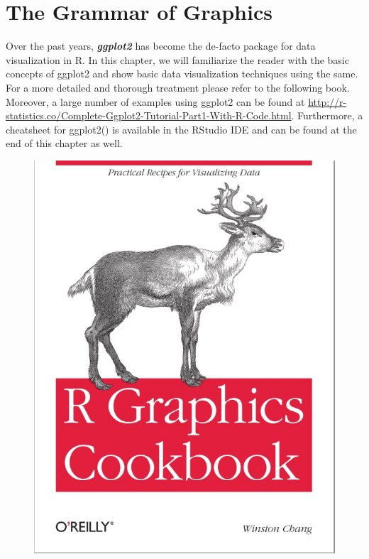 \documentclass[12pt]{book}\usepackage{knitr}
\begin{document}
\section{The Grammar of Graphics}

\begin{HIGHLIGHT}
\par{}
\end{HIGHLIGHT}

\noindent Over the past years, \textbf{\emph{ggplot2}} has become the de-facto package for data visualization in R. In this chapter, we will familiarize the reader with the basic concepts of ggplot2 and show basic data visualization techniques using the same. For a more detailed and thorough treatment please refer to the following book. Moreover, a large number of examples using ggplot2 can be found at \textcolor{cyan}{\url{http://r-statistics.co/Complete-Ggplot2-Tutorial-Part1-With-R-Code.html}}. Furthermore, a cheatsheet for ggplot2() is available in the RStudio IDE and can be found at the end of this chapter as well.    

\begin{figure}[ht]
      \centering
      \includegraphics[width = 6 cm]{./viz/ext/RCookbook.jpeg}
\end{figure}
\end{document}
